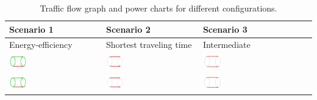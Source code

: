 \begin{table}[b]
	\centering
	\renewcommand{\arraystretch}{1.3}
	\begin{tabularx}{\textwidth}{|Y|Y|Y|Y|}
		\hline
		
		\textbf{Scenario 1} & \textbf{Scenario 2} & \textbf{Scenario 3} \\
		
		\hline
		
		Energy-efficiency &
		Shortest traveling time &
		Intermediate \\
		
		\hline
		
		\includegraphics[width=0.20\textwidth, trim=0 0 0 -3]{gfx/Graph2.png} &
		\includegraphics[width=0.20\textwidth, trim=0 0 0 -3]{gfx/Graph1.png} &
		\includegraphics[width=0.20\textwidth, trim=0 0 0 -3]{gfx/Graph1.png} \\
		
		\hline
		
		\includegraphics[width=0.20\textwidth, trim=0 0 0 -3]{gfx/Graph2.png} &
		\includegraphics[width=0.20\textwidth, trim=0 0 0 -3]{gfx/Graph1.png} &
		\includegraphics[width=0.20\textwidth, trim=0 0 0 -3]{gfx/Graph1.png} \\
		\hline			
	\end{tabularx}
	\caption{Traffic flow graph and power charts for different configurations.}
	\label{figure:examples}
\end{table}
